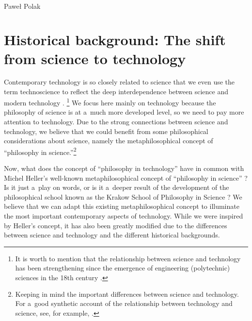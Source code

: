 \begin{artengenv}{Paweł Polak}
\section{Historical background: The shift from science to technology}

Contemporary technology is so closely related to science that we even use the term technoscience to reflect the deep interdependence between science and modern technology 
\parencite[][]{hottois_technoscience_2023}.%
\footnote{It is worth to mention that the relationship between science and technology has been strengthening since the emergence of engineering (polytechnic) sciences in the 18th century 
\parencite[][p.669]{janeczek_nauka_2019}.%
} We focus here mainly on technology because the philosophy of science is at a~much more developed level, so we need to pay more attention to technology. Due to the strong connections between science and technology, we believe that we could benefit from some philosophical considerations about science, namely the metaphilosophical concept of ``philosophy in science.''\footnote{Keeping in mind the important differences between science and technology. For a~good synthetic account of the relationship between technology and science, see, for example, 
\parencite[][]{franssen_philosophy_2023}.%
}



Now, what does the concept of ``philosophy in technology'' have in common with Michel Heller's well-known metaphilosophical concept of ``philosophy in science'' 
\parencites[][]{heller_how_2019}[see also][]{polak_philosophy_2019}? %
 Is it just a~play on words, or is it a~deeper result of the development of the philosophical school known as the Krakow School of Philosophy in Science 
\parencite[][]{polak_krakow_2022}? %
 We believe that we can adapt this existing metaphilosophical concept to illuminate the most important contemporary aspects of technology. While we were inspired by Heller's concept, it has also been greatly modified due to the differences between science and technology and the different historical backgrounds.




\end{artengenv}
